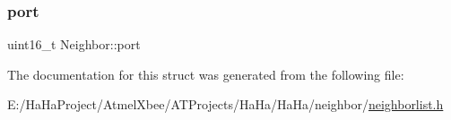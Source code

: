 \subsubsection{\texorpdfstring{port}{port}}
{\footnotesize\ttfamily uint16\+\_\+t Neighbor\+::port}



The documentation for this struct was generated from the following file\+:\begin{DoxyCompactItemize}
\item 
E\+:/\+Ha\+Ha\+Project/\+Atmel\+Xbee/\+A\+T\+Projects/\+Ha\+Ha/\+Ha\+Ha/neighbor/\hyperlink{neighborlist_8h}{neighborlist.\+h}\end{DoxyCompactItemize}
